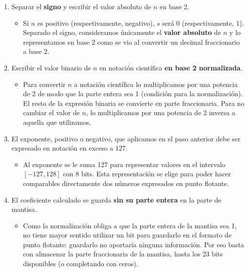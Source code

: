 \documentclass[spanish,A4,]{article}
\begin{document}
\begin{enumerate}
\def\labelenumi{\arabic{enumi}.}
\itemsep1pt\parskip0pt
\item
  Separar el \textbf{signo} y escribir el valor absoluto de $n$ en base
  2.

  \begin{itemize}
  \itemsep1pt\parskip0pt
  \item
    Si $n$ es positivo (respectivamente, negativo), $s$ será 0
    (respectivamente, 1). Separado el signo, consideramos únicamente el
    \textbf{valor absoluto} de $n$ y lo representamos en base 2 como se
    vio al convertir un decimal fraccionario a base 2.
  \end{itemize}
\item
  Escribir el valor binario de $n$ en notación científica \textbf{en
  base 2 normalizada}.

  \begin{itemize}
  \itemsep1pt\parskip0pt
  \item
    Para convertir $n$ a notación científica lo multiplicamos por una
    potencia de 2 de modo que la parte entera sea 1 (condición para la
    normalización). El resto de la expresión binaria se convierte en
    parte fraccionaria. Para no cambiar el valor de $n$, lo
    multiplicamos por una potencia de 2 inversa a aquella que
    utilizamos.
  \end{itemize}
\item
  El exponente, positivo o negativo, que aplicamos en el paso anterior
  debe ser expresado en notación en exceso a 127.

  \begin{itemize}
  \itemsep1pt\parskip0pt
  \item
    Al exponente se le suma 127 para representar valores en el intervalo
    $[-127,128]$ con 8 bits. Esta representación se elige para poder
    hacer comparables directamente dos números expresados en punto
    flotante.
  \end{itemize}
\item
  El coeficiente calculado se guarda \textbf{sin su parte entera} en la
  parte de mantisa.

  \begin{itemize}
  \itemsep1pt\parskip0pt
  \item
    Como la normalización obliga a que la parte entera de la mantisa sea
    1, no tiene mayor sentido utilizar un bit para guardarlo en el
    formato de punto flotante: guardarlo no aportaría ninguna
    información. Por eso basta con almacenar la parte fraccionaria de la
    mantisa, hasta los 23 bits disponibles (o completando con ceros).
  \end{itemize}
\end{enumerate}
\end{document}
